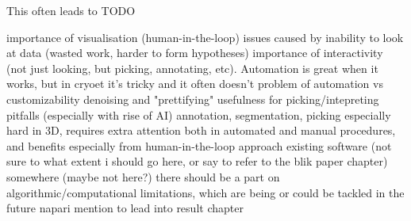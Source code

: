 This often leads to TODO


\begin{outline}
\1 importance of visualisation (human-in-the-loop)
    \2 issues caused by inability to look at data (wasted work, harder to form hypotheses)
    \2 importance of interactivity (not just looking, but picking, annotating, etc). Automation is great when it works, but in cryoet it's tricky and it often doesn't
        \3 problem of automation vs customizability
\1 denoising and "prettifying"
    \2 usefulness for picking/intepreting
    \2 pitfalls (especially with rise of AI)
\1 annotation, segmentation, picking
    \2 especially hard in 3D, requires extra attention both in automated and manual procedures, and benefits especially from human-in-the-loop approach
    \2 existing software (not sure to what extent i should go here, or say to refer to the blik paper chapter)
\1 somewhere (maybe not here?) there should be a part on algorithmic/computational limitations, which are being or could be tackled in the future
\1 napari mention to lead into result chapter
\end{outline}
